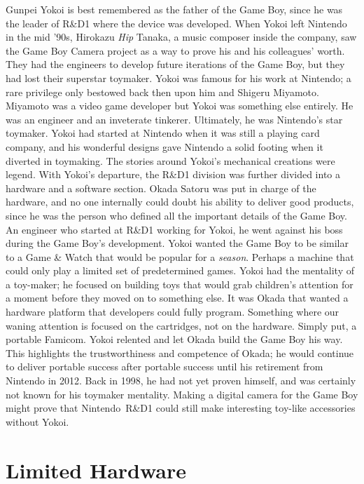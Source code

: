 \documentclass{book}
\begin{document}
Gunpei Yokoi is best remembered as the father of the Game Boy, since he was the leader of R\&D1 where the device was developed. When Yokoi left Nintendo in the mid ’90s, Hirokazu \emph{Hip} Tanaka, a music composer inside the company, saw the Game Boy Camera project as a way to prove his and his colleagues’ worth. They had the engineers to develop future iterations of the Game Boy, but they had lost their superstar toymaker. Yokoi was famous for his work at Nintendo; a rare privilege only bestowed back then upon him and Shigeru Miyamoto. Miyamoto was a video game developer but Yokoi was something else entirely. He was an engineer and an inveterate tinkerer. Ultimately, he was Nintendo’s star toymaker. Yokoi had started at Nintendo when it was still a playing card company, and his wonderful designs gave Nintendo a solid footing when it diverted in toymaking. The stories around Yokoi’s mechanical creations were legend. With Yokoi’s departure, the R\&D1 division was further divided into a hardware and a software section. Okada Satoru was put in charge of the hardware, and no one internally could doubt his ability to deliver good products, since he was the person who defined all the important details of the Game Boy. An engineer who started at R\&D1 working for Yokoi, he went against his boss during the Game Boy’s development. Yokoi wanted the Game Boy to be similar to a Game \& Watch that would be popular for a \emph{season}. Perhaps a machine that could only play a limited set of predetermined games. Yokoi had the mentality of a toy-maker; he focused on building toys that would grab children’s attention for a moment before they moved on to something else. It was Okada that wanted a hardware platform that developers could fully program. Something where our waning attention is focused on the cartridges, not on the hardware. Simply put, a portable Famicom. Yokoi relented and let Okada build the Game Boy his way. This highlights the trustworthiness and competence of Okada; he would continue to deliver portable success after portable success until his retirement from Nintendo in 2012. Back in 1998, he had not yet proven himself, and was certainly not known for his toymaker mentality. Making a digital camera for the Game Boy might prove that Nintendo R\&D1 could still make interesting toy-like accessories without Yokoi.

\FloatBarrier\needspace{10mm}\section*{Limited Hardware}\nopagebreak[4]
\end{document}
